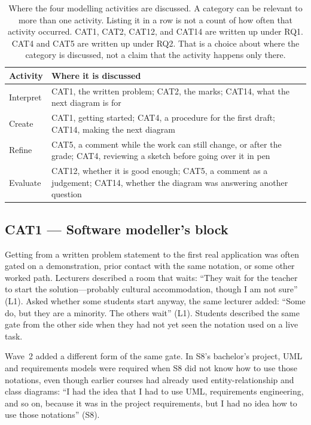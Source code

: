 \begin{table}[htbp]
\centering
\small
\caption{Where the four modelling activities are discussed. A category can be relevant to more than one activity. Listing it in a row is not a count of how often that activity occurred. CAT1, CAT2, CAT12, and CAT14 are written up under RQ1. CAT4 and CAT5 are written up under RQ2. That is a choice about where the category is discussed, not a claim that the activity happens only there.}
\label{tab:activity_matrix}
\begin{tabularx}{\textwidth}{l >{\raggedright\arraybackslash}X}
\toprule
\textbf{Activity} & \textbf{Where it is discussed} \\
\midrule
Interpret & CAT1, the written problem; CAT2, the marks; CAT14, what the next diagram is for \\
Create & CAT1, getting started; CAT4, a procedure for the first draft; CAT14, making the next diagram \\
Refine & CAT5, a comment while the work can still change, or after the grade; CAT4, reviewing a sketch before going over it in pen \\
Evaluate & CAT12, whether it is good enough; CAT5, a comment as a judgement; CAT14, whether the diagram was answering another question \\
\bottomrule
\end{tabularx}
\end{table}

\subsection{CAT1 --- Software modeller's block}
\label{sec:cat1}

Getting from a written problem statement to the first real application was often gated on a demonstration, prior contact with the same notation, or some other worked path. Lecturers described a room that waits: ``They wait for the teacher to start the solution---probably cultural accommodation, though I am not sure'' (L1). Asked whether some students start anyway, the same lecturer added: ``Some do, but they are a minority. The others wait'' (L1). Students described the same gate from the other side when they had not yet seen the notation used on a live task.

Wave~2 added a different form of the same gate. In S8's bachelor's project, UML and requirements models were required when S8 did not know how to use those notations, even though earlier courses had already used entity-relationship and class diagrams: ``I had the idea that I had to use UML, requirements engineering, and so on, because it was in the project requirements, but I had no idea how to use those notations'' (S8).

